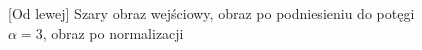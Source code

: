 \documentclass[a4paper,12pt, titlepage]{report}
\begin{document}
\FloatBarrier
\begin{figure}[h]
    \centering
    \caption{[Od lewej] Szary obraz wejściowy, obraz po podniesieniu do potęgi \(\alpha=3\), obraz po normalizacji}%
    \label{fig:rysunek}%
\end{figure}
\FloatBarrier
\end{document}
